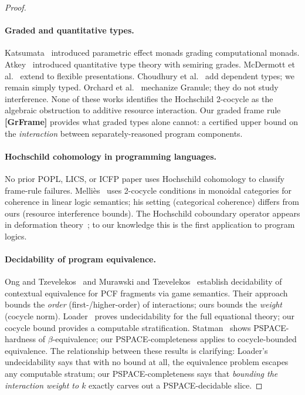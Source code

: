 \documentclass[acmsmall,sigplan,anonymous,review,screen]{acmart}
\theoremstyle{plain}
\theoremstyle{definition}
\begin{document}
\begin{proof}
\paragraph{Graded and quantitative types.}
Katsumata~\cite{katsumata2014parametric} introduced parametric effect
monads grading computational monads.  Atkey~\cite{atkey2018quantitative}
introduced quantitative type theory with semiring grades.
McDermott et al.~\cite{mcdermott2022flexible} extend to flexible
presentations.  Choudhury et al.~\cite{choudhury2021graded} add
dependent types; we remain simply typed.  Orchard et al.\
\cite{orchard2019quantitative} mechanize Granule; they do not study
interference.  None of these works identifies the Hochschild 2-cocycle
as the algebraic obstruction to additive resource interaction.
Our graded frame rule \textbf{[GrFrame]} provides what graded types
alone cannot: a certified upper bound on the \emph{interaction} between
separately-reasoned program components.

\paragraph{Hochschild cohomology in programming languages.}
No prior POPL, LICS, or ICFP paper uses Hochschild cohomology to
classify frame-rule failures.  Melli\`es~\cite{mellies2009categorical}
uses 2-cocycle conditions in monoidal categories for coherence in linear
logic semantics; his setting (categorical coherence) differs from ours
(resource interference bounds).  The Hochschild coboundary operator
appears in deformation theory~\cite{hochschild1945cohomology};
to our knowledge this is the first application to program logics.

\paragraph{Decidability of program equivalence.}
Ong and Tzevelekos~\cite{ong2009normal} and Murawski and
Tzevelekos~\cite{murawski2012algorithmic} establish decidability of
contextual equivalence for PCF fragments via game semantics.  Their
approach bounds the \emph{order} (first-/higher-order) of interactions;
ours bounds the \emph{weight} (cocycle norm).  Loader~\cite{loader1997equational}
proves undecidability for the full equational theory; our cocycle bound
provides a computable stratification.  Statman~\cite{statman1979completeness}
shows PSPACE-hardness of $\beta$-equivalence; our PSPACE-completeness
applies to cocycle-bounded equivalence.  The relationship between these
results is clarifying: Loader's undecidability says that with no bound
at all, the equivalence problem escapes any computable stratum; our
PSPACE-completeness says that \emph{bounding the interaction weight to
$k$} exactly carves out a PSPACE-decidable slice.


\end{proof}
\end{document}
